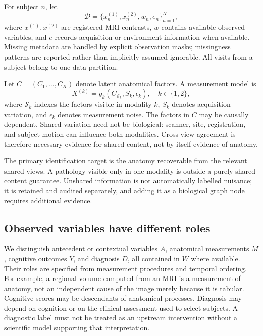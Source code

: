 \documentclass[10pt,twocolumn,letterpaper]{article}
\begin{document}
For subject $n$, let
\begin{equation}
 \mathcal D=\{x_n^{(1)},x_n^{(2)},w_n,e_n\}_{n=1}^{N},
\end{equation}
where $x^{(1)},x^{(2)}$ are registered MRI contrasts, $w$ contains available observed variables, and $e$ records acquisition or environment information when available. Missing metadata are handled by explicit observation masks; missingness patterns are reported rather than implicitly assumed ignorable. All visits from a subject belong to one data partition.

Let $C=(C_1,\ldots,C_K)$ denote latent anatomical factors. A measurement model is
\begin{equation}
 X^{(k)}=g_k(C_{\mathcal S_k},S_k,\epsilon_k),\quad k\in\{1,2\},
 \label{eq:measurement}
\end{equation}
where $\mathcal S_k$ indexes the factors visible in modality $k$, $S_k$ denotes acquisition variation, and $\epsilon_k$ denotes measurement noise. The factors in $C$ may be causally dependent. Shared variation need not be biological: scanner, site, registration, and subject motion can influence both modalities. Cross-view agreement is therefore necessary evidence for shared content, not by itself evidence of anatomy.

The primary identification target is the anatomy recoverable from the relevant shared views. A pathology visible only in one modality is outside a purely shared-content guarantee. Unshared information is not automatically labelled nuisance; it is retained and audited separately, and adding it as a biological graph node requires additional evidence.

\subsection{Observed variables have different roles}

We distinguish antecedent or contextual variables $A$, anatomical measurements $M$, cognitive outcomes $Y$, and diagnosis $D$, all contained in $W$ where available. Their roles are specified from measurement procedures and temporal ordering. For example, a regional volume computed from an MRI is a measurement of anatomy, not an independent cause of the image merely because it is tabular. Cognitive scores may be descendants of anatomical processes. Diagnosis may depend on cognition or on the clinical assessment used to select subjects. A diagnostic label must not be treated as an upstream intervention without a scientific model supporting that interpretation.
\end{document}
